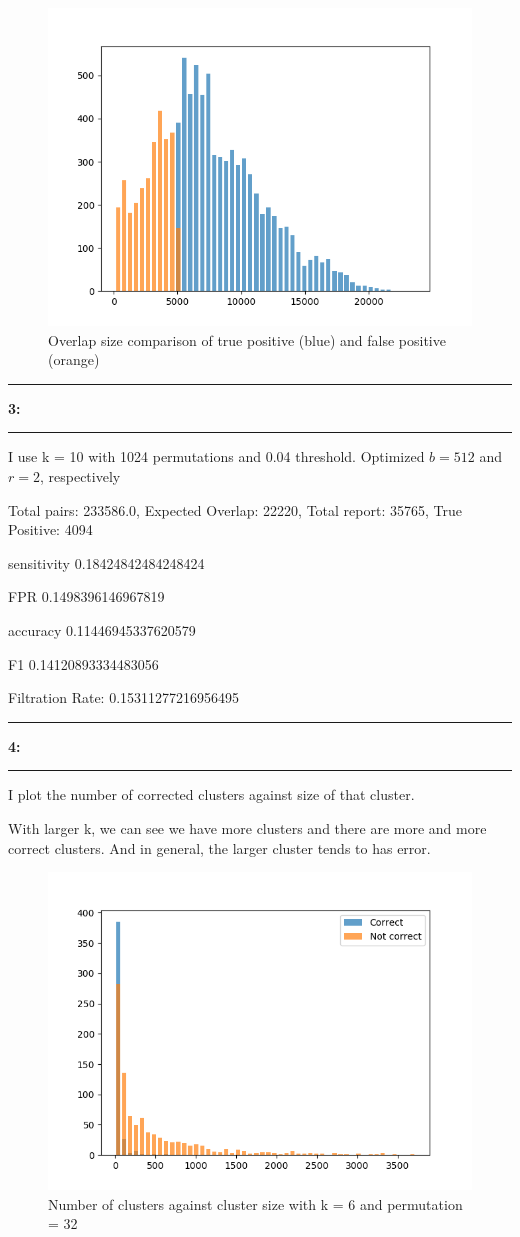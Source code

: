 \documentclass[11pt]{article}
\newcommand\question[2]{\vspace{.25in}\hrule\textbf{#1: #2}\vspace{.5em}\hrule\vspace{.10in}}
\begin{document}
\begin{figure}[H]
	\centering
	\includegraphics[width = .8\textwidth]{Ecoli_Pacbio_simulate_30X_5000_1000_k12_512_0p01.png}
	\caption{Overlap size comparison of true positive (blue) and false positive (orange)}
	\label{fig1}
	
\end{figure}


\question{3}{}
I use k = 10 with 1024 permutations and 0.04 threshold. Optimized $ b = 512 $ and $ r = 2 $, respectively


Total pairs: 233586.0, Expected Overlap: 22220, Total report: 35765, True Positive: 4094

sensitivity 0.18424842484248424

FPR 0.1498396146967819

accuracy 0.11446945337620579

F1 0.14120893334483056

Filtration Rate: 0.15311277216956495

\question{4}{}

I plot the number of corrected clusters against size of that cluster.

With larger k, we can see we have more clusters and there are more and more correct clusters. And in general, the larger cluster tends to has error.

\begin{figure}[H]
	\centering
	\includegraphics[width = .8\textwidth]{virus_reads_k6_32_cluster.png}
	\caption{Number of clusters against cluster size with k = 6 and permutation = 32}
	\label{fig1}	
\end{figure}
\end{document}
